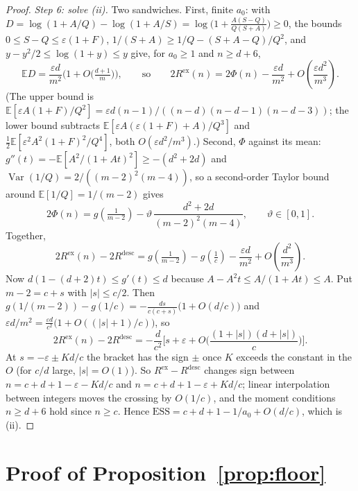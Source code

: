 \documentclass[10pt]{article}
\newcommand{\ess}{\mathrm{ESS}}
\newcommand{\E}{\mathbb{E}}
\begin{document}
\begin{proof}
\emph{Step 6: solve (ii).} Two sandwiches. First, finite $a_0$: with $D = \log(1 + A/Q) - \log(1 + A/S) = \log\big(1 + \tfrac{A(S-Q)}{Q(S+A)}\big) \ge 0$, the bounds $0 \le S - Q \le \varepsilon(1+F)$, $1/(S+A) \ge 1/Q - (S + A - Q)/Q^2$, and $y - y^2/2 \le \log(1+y) \le y$ give, for $a_0 \ge 1$ and $n \ge d + 6$,
\[
\E D = \frac{\varepsilon d}{m^2}\Big(1 + O\big(\tfrac{d+1}{m}\big)\Big),
\qquad\text{so}\qquad
2R^{\mathrm{ex}}(n) = 2\Phi(n) - \frac{\varepsilon d}{m^2} + O\!\left(\frac{\varepsilon d^2}{m^3}\right).
\]
(The upper bound is $\E[\varepsilon A (1+F)/Q^2] = \varepsilon d (n-1)/((n-d)(n-d-1)(n-d-3))$; the lower bound subtracts $\E[\varepsilon A (\varepsilon(1+F) + A)/Q^3]$ and $\tfrac12 \E[\varepsilon^2 A^2 (1+F)^2 / Q^4]$, both $O(\varepsilon d^2 / m^3)$.) Second, $\Phi$ against its mean: $g''(t) = -\E[A^2/(1+At)^2] \ge -(d^2 + 2d)$ and $\operatorname{Var}(1/Q) = 2/((m-2)^2(m-4))$, so a second-order Taylor bound around $\E[1/Q] = 1/(m-2)$ gives
\[
2\Phi(n) = g\!\left(\tfrac{1}{m-2}\right) - \vartheta\,\frac{d^2 + 2d}{(m-2)^2 (m-4)}, \qquad \vartheta \in [0, 1] .
\]
Together,
\[
2R^{\mathrm{ex}}(n) - 2R^{\mathrm{desc}} = g\!\left(\tfrac{1}{m-2}\right) - g\!\left(\tfrac1c\right) - \frac{\varepsilon d}{m^2} + O\!\left(\frac{d^2}{m^3}\right).
\]
Now $d(1 - (d+2)t) \le g'(t) \le d$ because $A - A^2 t \le A/(1+At) \le A$. Put $m - 2 = c + s$ with $|s| \le c/2$. Then $g(1/(m-2)) - g(1/c) = -\frac{ds}{c(c+s)}\big(1 + O(d/c)\big)$ and $\varepsilon d/m^2 = \frac{\varepsilon d}{c^2}\big(1 + O((|s|+1)/c)\big)$, so
\[
2R^{\mathrm{ex}}(n) - 2R^{\mathrm{desc}} = -\frac{d}{c^2}\Big[s + \varepsilon + O\!\Big(\frac{(1 + |s|)(d + |s|)}{c}\Big)\Big].
\]
At $s = -\varepsilon \pm K d/c$ the bracket has the sign $\pm$ once $K$ exceeds the constant in the $O$ (for $c/d$ large, $|s| = O(1)$). So $R^{\mathrm{ex}} - R^{\mathrm{desc}}$ changes sign between $n = c + d + 1 - \varepsilon - Kd/c$ and $n = c + d + 1 - \varepsilon + Kd/c$; linear interpolation between integers moves the crossing by $O(1/c)$, and the moment conditions $n \ge d + 6$ hold since $n \ge c$. Hence $\ess = c + d + 1 - 1/a_0 + O(d/c)$, which is (ii).
\end{proof}

\section{Proof of Proposition~\ref{prop:floor}}\label{app:floor}
\end{document}
